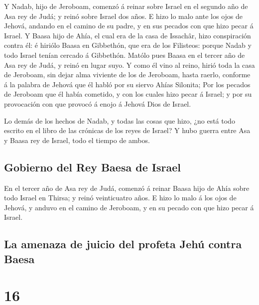  Y Nadab, hijo de Jeroboam, comenzó á reinar sobre Israel
en el segundo año de Asa rey de Judá; y reinó sobre Israel dos años.
 E hizo lo malo ante los ojos de Jehová, andando en el
camino de su padre, y en sus pecados con que hizo pecar á Israel.
 Y Baasa hijo de Ahía, el cual era de la casa de
Issachâr, hizo conspiración contra él: é hiriólo Baasa en Gibbethón, que
era de los Filisteos: porque Nadab y todo Israel tenían cercado á
Gibbethón.  Matólo pues Baasa en el tercer año de Asa rey
de Judá, y reinó en lugar suyo.  Y como él vino al reino,
hirió toda la casa de Jeroboam, sin dejar alma viviente de los de
Jeroboam, hasta raerlo, conforme á la palabra de Jehová que él habló por
su siervo Ahías Silonita;  Por los pecados de Jeroboam
que él había cometido, y con los cuales hizo pecar á Israel; y por su
provocación con que provocó á enojo á Jehová Dios de Israel.

 Lo demás de los hechos de Nadab, y todas las cosas que
hizo, ¿no está todo escrito en el libro de las crónicas de los reyes de
Israel?  Y hubo guerra entre Asa y Baasa rey de Israel,
todo el tiempo de ambos.

\hypertarget{gobierno-del-rey-baesa-de-israel}{%
\subsection{Gobierno del Rey Baesa de
Israel}\label{gobierno-del-rey-baesa-de-israel}}

 En el tercer año de Asa rey de Judá, comenzó á reinar
Baasa hijo de Ahía sobre todo Israel en Thirsa; y reinó veinticuatro
años.  E hizo lo malo á los ojos de Jehová, y anduvo en
el camino de Jeroboam, y en su pecado con que hizo pecar á Israel.

\hypertarget{la-amenaza-de-juicio-del-profeta-jehuxfa-contra-baesa}{%
\subsection{La amenaza de juicio del profeta Jehú contra
Baesa}\label{la-amenaza-de-juicio-del-profeta-jehuxfa-contra-baesa}}

\hypertarget{section-11-16}{%
\section{16}\label{section-11-16}}


